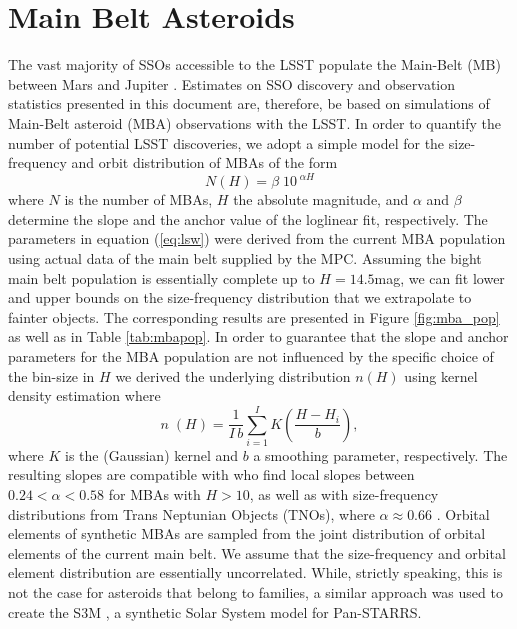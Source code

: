 \section{Main Belt Asteroids} \label{sec:mba}
The vast majority of SSOs accessible to the LSST populate the Main-Belt (MB) between Mars and Jupiter \citep{LSSTscibook2009}. Estimates on SSO discovery and observation statistics presented in this document are, therefore, be based on simulations of Main-Belt asteroid (MBA) observations with the LSST. 
In order to quantify the number of potential LSST discoveries, we adopt a simple model for the size-frequency and orbit distribution of MBAs of the form
\begin{equation}
 N(H)=\beta\;10^{\;\alpha H}
 \label{eq:lsw}
\end{equation}
where $N$ is the number of MBAs, $H$ the absolute magnitude, and $\alpha$ and $\beta$ determine the slope and the anchor value of the loglinear fit, respectively.
The parameters in equation (\ref{eq:lsw}) were derived from the current MBA population using actual data of the main belt supplied by the MPC. 
Assuming the bight main belt population is essentially complete up to $H=14.5$mag, we can fit lower and upper bounds on the size-frequency distribution that we extrapolate to fainter objects. The corresponding results are presented in Figure \ref{fig:mba_pop} as well as in Table \ref{tab:mbapop}.
In order to guarantee that the slope and anchor parameters for the MBA population are not influenced by the specific choice of the bin-size in $H$ we derived the underlying distribution $n(H)$ using kernel density estimation where
\begin{equation}
 n\;(H)=\frac{1}{I\,b} \sum_{i=1}^{I} K\left(\frac{H-H_i}{b}\right),
 \label{eggl:eq:kernel}
\end{equation}
where $K$ is the (Gaussian) kernel and $b$ a smoothing parameter, respectively. The resulting slopes are compatible with \citet{jedicke2002} who find local slopes between $0.24<\alpha<0.58$ for MBAs with $H>10$, as well as with size-frequency distributions from Trans Neptunian Objects (TNOs), where $\alpha\approx0.66$ \citep{bernstein2004}.
Orbital elements of synthetic MBAs are sampled from the joint distribution of orbital elements of the current main belt. We assume that the size-frequency and orbital element distribution are essentially uncorrelated. While, strictly speaking, this is not the case for asteroids that belong to families, a similar approach was used to create the S3M \citep{s3m}, a synthetic Solar System model for Pan-STARRS.
